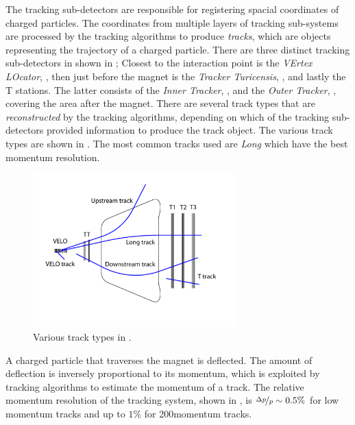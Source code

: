The tracking sub-detectors are responsible for registering spacial coordinates of charged particles.
The coordinates from multiple layers of tracking sub-systems are processed by the tracking algorithms
to produce {\it tracks}, which are objects representing the trajectory of a charged particle. There are
three distinct tracking sub-detectors in \lhcb shown in ; Closest to the interaction point is
the {\it VErtex LOcator}, \velo, then just before the \lhcb magnet is the {\it Tracker Turicensis}, \ttracker,
and  lastly the T stations. The latter consists of the {\it Inner Tracker}, \intr, and the {\it Outer Tracker}, \ot,
covering the area after the \lhcb magnet. There are several track types that are {\it reconstructed} by
the tracking algorithms, depending on which of the tracking sub-detectors provided information to produce
the track object. The various track types are shown in . The most common tracks used
are {\it Long} which have the best momentum resolution.

\begin{figure}[t]
  \centering
  \includegraphics[width=0.7\textwidth]{Figures/Chapter2/trackTypesRunIAndII}
  \caption{Various track types in \lhcb.}
  \label{track_types}
\end{figure}

A charged particle that traverses the \lhcb magnet is deflected. The amount of deflection is inversely proportional
to its momentum, which is exploited by tracking algorithms to estimate the momentum of a track. The relative
momentum resolution of the tracking system, shown in , is $\nicefrac{\Delta p}{p} \sim 0.5 \%$
for low momentum tracks and up to $1\%$ for 200\gevc momentum tracks.


